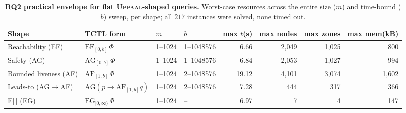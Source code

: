 \begin{table}[t]\centering
\caption{\textbf{RQ2 practical envelope for flat \textsc{Uppaal}-shaped queries.} Worst-case resources across the entire size ($m$) and time-bound ($b$) sweep, per shape; all $217$ instances were solved, none timed out.}\label{tab:perf-rq2}
\small\setlength{\tabcolsep}{5pt}
\begin{tabular}{llllrrrr}
\toprule
Shape & TCTL form & $m$ & $b$ & max $t$(s) & max nodes & max zones & max mem(kB) \\
\midrule
Reachability (EF) & $\mathrm{EF}_{[0,b]}\,\Phi$ & 1--1024 & 1--1048576 & 6.66 & 2{,}049 & 1{,}025 & 800 \\
Safety (AG) & $\mathrm{AG}_{[0,b]}\,\Phi$ & 1--1024 & 1--1048576 & 6.84 & 2{,}053 & 1{,}027 & 994 \\
Bounded liveness (AF) & $\mathrm{AF}_{[1,b]}\,\Phi$ & 1--1024 & 2--1048576 & 19.12 & 4{,}101 & 3{,}074 & 1{,}602 \\
Leads-to (AG$\to$AF) & $\mathrm{AG}(p\!\to\!\mathrm{AF}_{[1,b]}q)$ & 1--1024 & 2--1048576 & 7.28 & 444 & 317 & 366 \\
E[\,] (EG) & $\mathrm{EG}_{[0,\infty)}\,\Phi$ & 1--1024 & -- & 6.97 & 7 & 4 & 147 \\
\bottomrule
\end{tabular}
\end{table}
